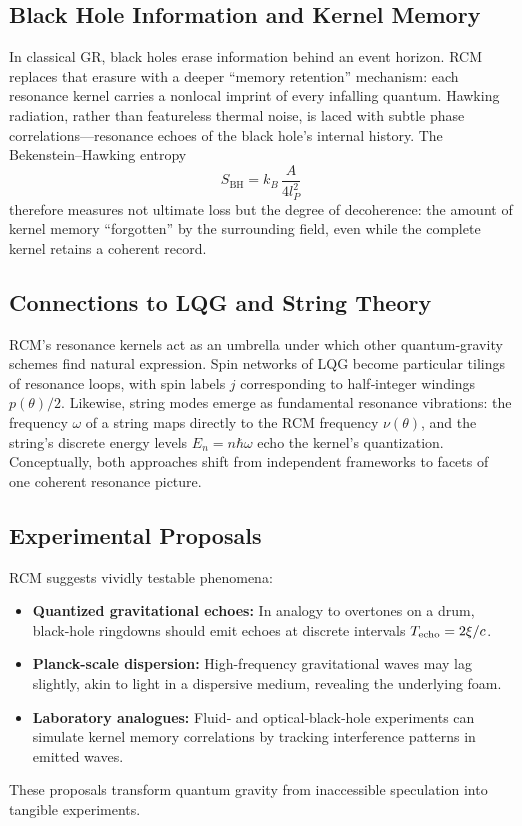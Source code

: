 \subsection{Black Hole Information and Kernel Memory}

In classical GR, black holes erase information behind an event horizon.  RCM replaces that erasure with a deeper “memory retention” mechanism: each resonance kernel carries a nonlocal imprint of every infalling quantum.  Hawking radiation, rather than featureless thermal noise, is laced with subtle phase correlations—resonance echoes of the black hole’s internal history.  The Bekenstein–Hawking entropy
\[
S_{\mathrm{BH}} = k_B\,\frac{A}{4l_P^2}
\]
therefore measures not ultimate loss but the degree of decoherence: the amount of kernel memory “forgotten” by the surrounding field, even while the complete kernel retains a coherent record.

\subsection{Connections to LQG and String Theory}

RCM’s resonance kernels act as an umbrella under which other quantum‐gravity schemes find natural expression.  Spin networks of LQG become particular tilings of resonance loops, with spin labels \(j\) corresponding to half‐integer windings \(p(\theta)/2\).  Likewise, string modes emerge as fundamental resonance vibrations: the frequency \(\omega\) of a string maps directly to the RCM frequency \(\nu(\theta)\), and the string’s discrete energy levels \(E_n=n\hbar\omega\) echo the kernel’s quantization.  Conceptually, both approaches shift from independent frameworks to facets of one coherent resonance picture.

\subsection{Experimental Proposals}

RCM suggests vividly testable phenomena:
\begin{itemize}
  \item \textbf{Quantized gravitational echoes:} In analogy to overtones on a drum, black-hole ringdowns should emit echoes at discrete intervals \(T_{\rm echo}=2\xi/c\).  
  \item \textbf{Planck-scale dispersion:} High-frequency gravitational waves may lag slightly, akin to light in a dispersive medium, revealing the underlying foam.  
  \item \textbf{Laboratory analogues:} Fluid‐ and optical‐black‐hole experiments can simulate kernel memory correlations by tracking interference patterns in emitted waves.
\end{itemize}
These proposals transform quantum gravity from inaccessible speculation into tangible experiments.

